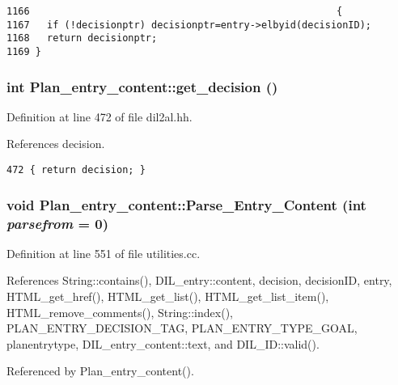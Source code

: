 \footnotesize\begin{verbatim}1166                                                     {
1167   if (!decisionptr) decisionptr=entry->elbyid(decisionID);
1168   return decisionptr;
1169 }
\end{verbatim}\normalsize 
{}
\subsubsection{\setlength{\rightskip}{0pt plus 5cm}int Plan\_\-entry\_\-content::get\_\-decision ()\hspace{0.3cm}{\tt  [inline]}}\label{classPlan__entry__content_a1}




Definition at line 472 of file dil2al.hh.

References decision.



\footnotesize\begin{verbatim}472 { return decision; }
\end{verbatim}\normalsize 
{}
\subsubsection{\setlength{\rightskip}{0pt plus 5cm}void Plan\_\-entry\_\-content::Parse\_\-Entry\_\-Content (int {\em parsefrom} = 0)}\label{classPlan__entry__content_a4}




Definition at line 551 of file utilities.cc.

References String::contains(), DIL\_\-entry::content, decision, decision\-ID, entry, HTML\_\-get\_\-href(), HTML\_\-get\_\-list(), HTML\_\-get\_\-list\_\-item(), HTML\_\-remove\_\-comments(), String::index(), PLAN\_\-ENTRY\_\-DECISION\_\-TAG, PLAN\_\-ENTRY\_\-TYPE\_\-GOAL, planentrytype, DIL\_\-entry\_\-content::text, and DIL\_\-ID::valid().

Referenced by Plan\_\-entry\_\-content().



